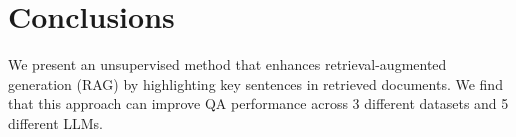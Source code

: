 \section{Conclusions}
We present an unsupervised method that enhances retrieval-augmented generation (RAG) by highlighting key sentences in retrieved documents. We find that this approach can improve QA performance across 3 different datasets and 5 different LLMs.
